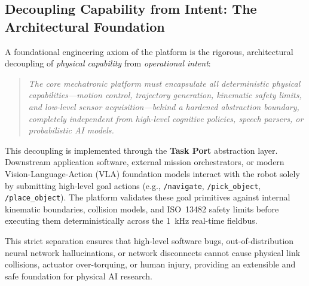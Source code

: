 \subsection{Decoupling Capability from Intent: The Architectural Foundation}
\label{subsec:decoupling_intent}
A foundational engineering axiom of the platform is the rigorous, architectural decoupling of \emph{physical capability} from \emph{operational intent}:
\begin{quote}
\emph{The core mechatronic platform must encapsulate all deterministic physical capabilities---motion control, trajectory generation, kinematic safety limits, and low-level sensor acquisition---behind a hardened abstraction boundary, completely independent from high-level cognitive policies, speech parsers, or probabilistic AI models.}
\end{quote}
This decoupling is implemented through the \textbf{Task Port} abstraction layer. Downstream application software, external mission orchestrators, or modern Vision-Language-Action (VLA) foundation models interact with the robot solely by submitting high-level goal actions (e.g., \texttt{/navigate}, \texttt{/pick\_object}, \texttt{/place\_object}). The platform validates these goal primitives against internal kinematic boundaries, collision models, and ISO~13482 safety limits before executing them deterministically across the 1~kHz real-time fieldbus. 

This strict separation ensures that high-level software bugs, out-of-distribution neural network hallucinations, or network disconnects cannot cause physical link collisions, actuator over-torquing, or human injury, providing an extensible and safe foundation for physical AI research.
